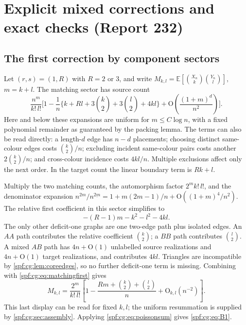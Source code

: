 \documentclass[11pt]{article}
\numberwithin{equation}{section}
\theoremstyle{definition}
\theoremstyle{remark}
\theoremstyle{definition}
\newcommand{\E}{\mathbb E}
\newcommand{\fall}[2]{{#1}^{\underline{#2}}}
\newcommand{\bigO}{\mathrm O}
\begin{document}
\section{Explicit mixed corrections and exact checks (Report 232)}
\label{spf:cg:sec:coefficients}

\subsection{The first correction by component sectors}
Let $(r,s)=(1,R)$ with $R=2$ or $3$, and write
$M_{k,l}=\E[\binom{X_n}{k}\binom{Y_n}{l}]$, $m=k+l$. The matching sector
has source count
\begin{equation}
 \frac{n^m}{k!\,l!}\bigg[1-\frac1n\bigg\{
 k+Rl+3\binom k2+3\binom l2+4kl\bigg\}
 +\bigO\!\left(\frac{(1+m)^d}{n^2}\right)\bigg].
 \label{spf:cg:eq:matchingcount}
\end{equation}
Here and below these expansions are uniform for $m\le C\log n$, with a
fixed polynomial remainder as guaranteed by the packing lemma. The terms
can also be read directly: a length-$d$ edge has $n-d$ placements; choosing
distinct same-colour edges costs $\binom k2/n$; excluding incident
same-colour pairs costs another $2\binom k2/n$; and cross-colour incidence
costs $4kl/n$. Multiple exclusions affect only the next order. In the
target count the linear boundary term is $Rk+l$.

Multiply the two matching counts, the automorphism factor $2^mk!\,l!$, and
the denominator expansion
$n^{2m}/\fall n{2m}=1+m(2m-1)/n+\bigO((1+m)^4/n^2)$. The relative first
coefficient in this sector simplifies to
\begin{equation}
 -(R-1)m-k^2-l^2-4kl.
 \label{spf:cg:eq:matchingfirst}
\end{equation}
The only other deficit-one graphs are one two-edge path plus isolated
edges. An $AA$ path contributes the relative coefficient $\binom k2$; a
$BB$ path contributes $\binom l2$. A mixed $AB$ path has $4n+\bigO(1)$
unlabelled source realizations and $4n+\bigO(1)$ target realizations, and
contributes $4kl$. Triangles are incompatible by
\cref{spf:cg:lem:coreedges}, so no further deficit-one term is missing.
Combining with \eqref{spf:cg:eq:matchingfirst} gives
\begin{equation}
 M_{k,l}=\frac{2^m}{k!\,l!}
 \left[1-\frac{Rm+\binom k2+\binom l2}{n}
 +\bigO_{k,l}(n^{-2})\right].
 \label{spf:cg:eq:momentfirst}
\end{equation}
This last display can be read for fixed $k,l$; the uniform resummation
is supplied by \cref{spf:cg:sec:assembly}. Applying
\eqref{spf:cg:eq:poissonsum} gives \eqref{spf:cg:eq:B1}.
\end{document}

